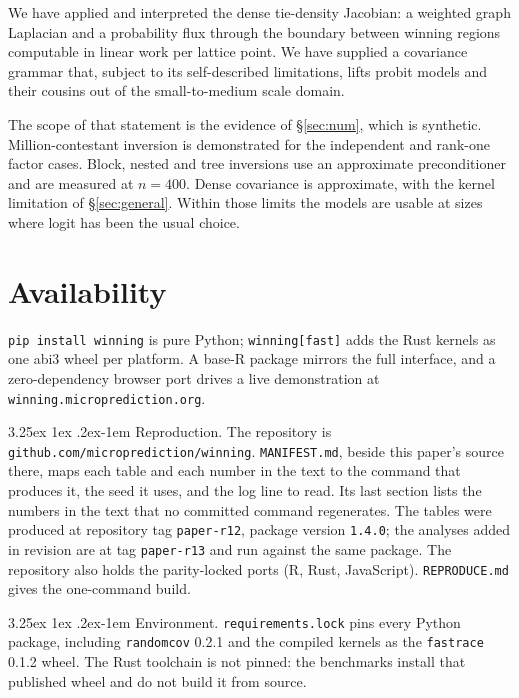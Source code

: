\documentclass[11pt]{article}
\makeatletter
\renewcommand\paragraph{\@startsection{paragraph}{4}{\z@}%
  {3.25ex \@plus1ex \@minus.2ex}{-1em}%
  {\normalfont\normalsize\itshape}}
\makeatother
\begin{document}
We have applied and interpreted the dense tie-density Jacobian: a weighted graph Laplacian and a probability flux through the boundary between winning regions computable in linear work per lattice point. We have supplied a covariance grammar that, subject to its self-described limitations, lifts probit models and their cousins out of the small-to-medium scale domain.

The scope of that statement is the evidence of \S\ref{sec:num}, which is synthetic. Million-contestant inversion is demonstrated for the independent and rank-one factor cases. Block, nested and tree inversions use an approximate preconditioner and are measured at $n=400$. Dense covariance is approximate, with the kernel limitation of \S\ref{sec:general}. Within those limits the models are usable at sizes where logit has been the usual choice.


\section{Availability}\label{sec:avail}
\texttt{pip install winning} is pure Python; \texttt{winning[fast]} adds the
Rust kernels as one abi3 wheel per platform. A base-R package mirrors the full
interface, and a zero-dependency browser port drives a live demonstration at
\texttt{winning.microprediction.org}.

\paragraph{Reproduction.} The repository is
\texttt{github.com/microprediction/winning}. \texttt{MANIFEST.md}, beside this paper's
source there, maps each table and each number in the text to
the command that produces it, the seed it
uses, and the log line to read. Its last section lists the numbers in
the text that no committed command regenerates. The tables were produced
at repository tag \texttt{paper-r12}, package version \texttt{1.4.0};
the analyses added in revision are at tag \texttt{paper-r13} and run
against the same package. The repository also holds the parity-locked
ports (R, Rust, JavaScript). \texttt{REPRODUCE.md} gives the one-command
build.

\paragraph{Environment.} \texttt{requirements.lock} pins every Python
package, including \texttt{randomcov} 0.2.1 and the compiled kernels as
the \texttt{fastrace} 0.1.2 wheel. The Rust toolchain is not pinned: the
benchmarks install that published wheel and do not build it from source.
\end{document}
